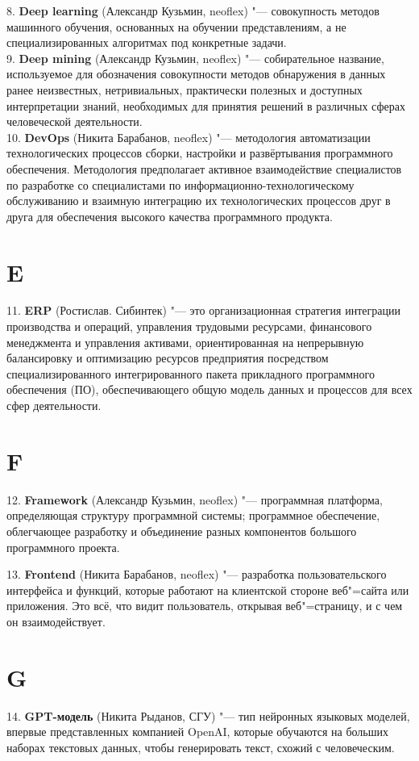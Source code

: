 \documentclass[14 pt]{extarticle}
\begin{document}
    8. \textbf{Deep learning} (Александр Кузьмин, neoflex) "--- совокупность методов машинного обучения, основанных на обучении представлениям, а не специализированных алгоритмах под конкретные задачи. \\

    9. \textbf{Deep mining} (Александр Кузьмин, neoflex) "--- собирательное название, используемое для обозначения совокупности методов обнаружения в данных ранее неизвестных, нетривиальных, практически полезных и доступных интерпретации знаний, необходимых для принятия решений в различных сферах человеческой деятельности. \\

    10. \textbf{DevOps} (Никита Барабанов, neoflex) "--- методология автоматизации технологических процессов сборки, настройки и развёртывания программного обеспечения. Методология предполагает активное взаимодействие специалистов по разработке со специалистами по информационно-технологическому обслуживанию и взаимную интеграцию их технологических процессов друг в друга для обеспечения высокого качества программного продукта.

\section*{E}
    11. \textbf{ERP} (Ростислав. Сибинтек) "--- это организационная стратегия интеграции производства и операций, управления трудовыми ресурсами, финансового менеджмента и управления активами, ориентированная на непрерывную балансировку и оптимизацию ресурсов предприятия посредством специализированного интегрированного пакета прикладного программного обеспечения (ПО), обеспечивающего общую модель данных и процессов для всех сфер деятельности.

\section*{F}
    12. \textbf{Framework} (Александр Кузьмин, neoflex) "--- программная платформа, определяющая структуру программной системы; программное обеспечение, облегчающее разработку и объединение разных компонентов большого программного проекта.
    
    13. \textbf{Frontend} (Никита Барабанов, neoflex) "--- разработка пользовательского интерфейса и функций, которые работают на клиентской стороне веб"=сайта или приложения. Это всё, что видит пользователь, открывая веб"=страницу, и с чем он взаимодействует.

\section*{G}
    14. \textbf{GPT-модель} (Никита Рыданов, СГУ) "--- тип нейронных языковых моделей, впервые представленных компанией OpenAI, которые обучаются на больших наборах текстовых данных, чтобы генерировать текст, схожий с человеческим. \\
    
\end{document}

